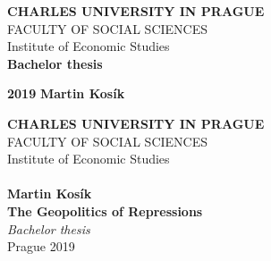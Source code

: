 \pagestyle{empty}
\begin{center}
\textbf{\LARGE{CHARLES UNIVERSITY IN PRAGUE}}\\
\Large{FACULTY OF SOCIAL SCIENCES}\\
\large{Institute of Economic Studies} \\
\vspace{60mm} \textbf{\LARGE{Bachelor thesis}}\\
\end{center}
\vspace{100mm} \textbf{\LARGE{2019}}  \hspace {65mm} \textbf{\LARGE{Martin Kosík}}\\
\vspace{11mm}
\newpage

\pagestyle{empty}
\begin{center}
\textbf{\LARGE{CHARLES UNIVERSITY IN PRAGUE}}\\
\Large{FACULTY OF SOCIAL SCIENCES}\\
\large{Institute of Economic Studies} \\
\\  %
\textbf{\large{Martin Kosík
}} \\
\vspace{10mm} \textbf{\LARGE{The Geopolitics of Repressions }}\\
\vspace{11mm} \textit{\Large{Bachelor thesis}} \\
\vspace{40mm} \large{Prague 2019}

\end{center}
\newpage


